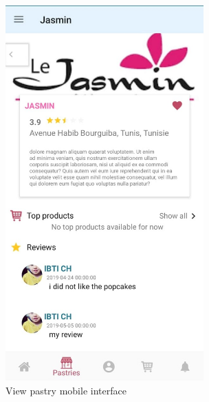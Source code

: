 \documentclass[12pt,a4paper]{report}
\begin{document}
\begin{figure}[H]
	\centering
	\includegraphics[width=3in,keepaspectratio]{showpastrymobile.jpg}
	\caption{View pastry mobile interface}
	\label{showpastrymobile-interface}
\end{figure}
\end{document}
